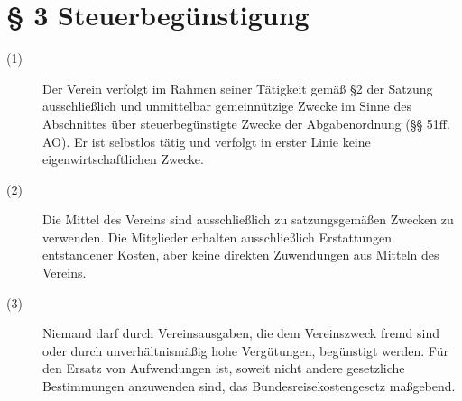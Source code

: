 \documentclass[a4paper,12pt]{scrartcl}
\begin{document}
\section*{\S{} 3 Steuerbegünstigung}
\begin{description} 

\item[(1)] Der Verein verfolgt im Rahmen seiner Tätigkeit gemäß §2 der Satzung ausschließlich und unmittelbar gemeinnützige Zwecke im Sinne des Abschnittes über steuerbegünstigte Zwecke der Abgabenordnung (§§ 51ff. AO). Er ist selbstlos tätig und verfolgt in erster Linie keine eigenwirtschaftlichen Zwecke.
\item[(2)] Die Mittel des Vereins sind ausschließlich zu satzungsgemäßen Zwecken zu verwenden. Die Mitglieder erhalten ausschließlich Erstattungen entstandener Kosten, aber keine direkten Zuwendungen aus Mitteln des Vereins.
\item[(3)] Niemand darf durch Vereinsausgaben, die dem Vereinszweck fremd sind oder durch unverhältnismäßig hohe Vergütungen, begünstigt werden. Für den Ersatz von Aufwendungen ist, soweit nicht andere gesetzliche Bestimmungen anzuwenden sind, das Bundesreisekostengesetz maßgebend.

\end{description}
\end{document}
